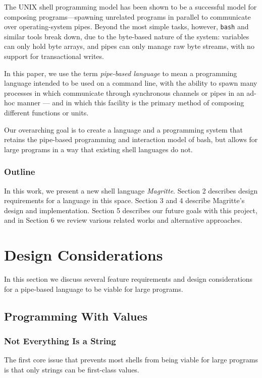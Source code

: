 \documentclass[english,preprint,JIP,uplatex]{ipsj}
\begin{document}
The UNIX shell programming model has been shown to be a successful model for composing programs---spawning unrelated programs in parallel to communicate over operating-system pipes. Beyond the most simple tasks, however, \verb/bash/ and similar tools break down, due to the byte-based nature of the system: variables can only hold byte arrays, and pipes can only manage raw byte streams, with no support for transactional writes.

In this paper, we use the term \emph{pipe-based language} to mean a programming language intended to be used on a command line, with the ability to spawn many processes in which communicate through synchronous channels or pipes in an ad-hoc manner --- and in which this facility is the primary method of composing different functions or units.

Our overarching goal is to create a language and a programming system that retains the pipe-based programming and interaction model of bash, but allows for large programs in a way that existing shell languages do not.

\subsubsection*{Outline}\noindent
In this work, we present a new shell language \emph{Magritte}. Section 2 describes design requirements for a language in this space. Section 3 and 4 describe Magritte's design and implementation. Section 5 describes our future goals with this project, and in Section 6 we review various related works and alternative approaches.

\section{Design Considerations}\label{design-considerations}
In this section we discuss several feature requirements and design considerations for a pipe-based language to be viable for large programs.

\subsection{Programming With Values}
\subsubsection{Not Everything Is a String}\noindent
The first core issue that prevents most shells from being viable for large programs is that only strings can be first-class values.
\end{document}
